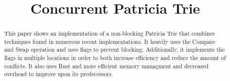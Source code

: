 \documentclass[conference]{IEEEtran}
\begin{document}
\title{Concurrent Patricia Trie}

\author{
\and
{}
}

\maketitle


\begin{abstract}
This paper shows an implementation of a non-blocking Patricia Trie that combines techniques found in numerous recent implementations. It heavily uses the Compare and Swap operation and uses flags to prevent blocking. Additionally, it implements the flags in multiple locations in order to both increase efficiency and reduce the amount of conflicts. It also uses Rust and more efficient memory managment and decreased overhead to improve upon its predecessors. 
\end{abstract}
\end{document}
